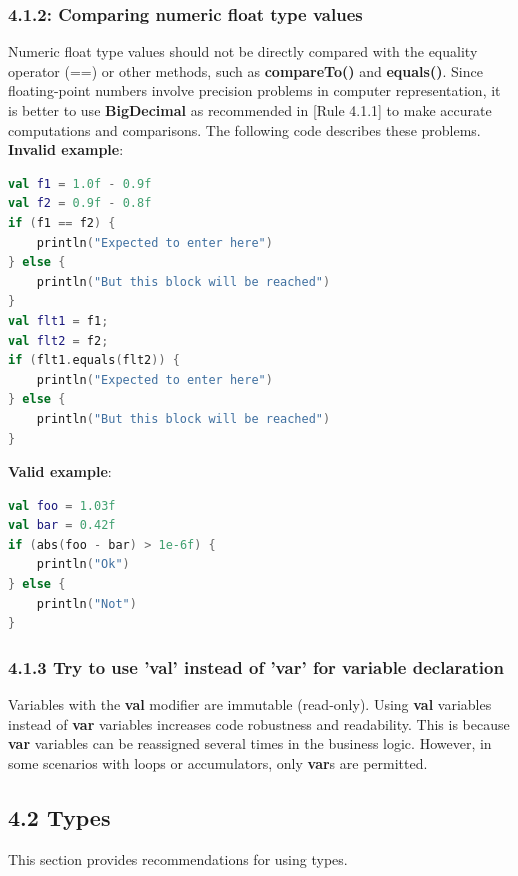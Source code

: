 \subsubsection*{\textbf{4.1.2: Comparing numeric float type values}}
\leavevmode\newline
\label{sec:4.1.2}
Numeric float type values should not be directly compared with the equality operator (==) or other methods, such as \textbf{compareTo()} and \textbf{equals()}. Since floating-point numbers involve precision problems in computer representation, it is better to use \textbf{BigDecimal} as recommended in [Rule 4.1.1] to make accurate computations and comparisons. The following code describes these problems.
\textbf{Invalid example}:
\begin{lstlisting}[language=Kotlin]
val f1 = 1.0f - 0.9f
val f2 = 0.9f - 0.8f
if (f1 == f2) {
    println("Expected to enter here")
} else {
    println("But this block will be reached")
}
val flt1 = f1;
val flt2 = f2;
if (flt1.equals(flt2)) {
    println("Expected to enter here")
} else {
    println("But this block will be reached")
}
\end{lstlisting}
\textbf{Valid example}:
\begin{lstlisting}[language=Kotlin]
val foo = 1.03f
val bar = 0.42f
if (abs(foo - bar) > 1e-6f) {
    println("Ok")
} else {
    println("Not")
}
\end{lstlisting}
\subsubsection*{\textbf{4.1.3 Try to use 'val' instead of 'var' for variable declaration}}
\leavevmode\newline
\label{sec:4.1.3}
Variables with the \textbf{val} modifier are immutable (read-only).
Using \textbf{val} variables instead of \textbf{var} variables increases code robustness and readability.
This is because \textbf{var} variables can be reassigned several times in the business logic.
However, in some scenarios with loops or accumulators, only \textbf{var}s are permitted.
\subsection*{\textbf{4.2 Types}}
\label{sec:4.2}
This section provides recommendations for using types.
